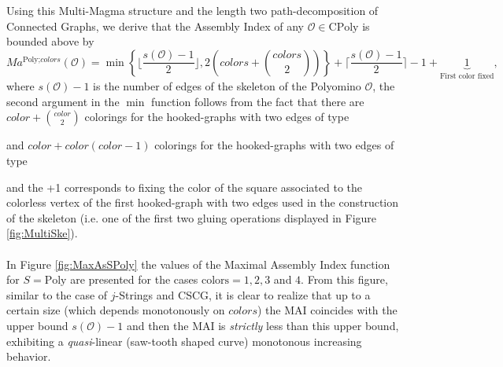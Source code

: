 \documentclass[letterpaper,12pt]{article}
\theoremstyle{definition}
\begin{document}
Using this Multi-Magma structure and the length two path-decomposition of Connected Graphs, we derive that the Assembly Index of any $\mathscr{O} \in \text{CPoly}$ is bounded above by
\begin{equation}
    Ma^{\text{Poly;}colors}(\mathscr{O}) = \min \left\{ \bigg\lfloor \frac{s(\mathscr{O})-1}{2} \bigg\rfloor, 2 \left(colors+\binom{colors}{2} \right)  \right\} + \bigg\lceil \frac{s(\mathscr{O})-1}{2} \bigg\rceil -1 + \underbrace{1}_{\text{First color fixed}},
\end{equation}
where $s(\mathscr{O})-1$ is the number of edges of the skeleton of the Polyomino $\mathscr{O}$, the second argument in the $\min$ function follows from the fact that there are $color+ \binom{color}{2}$ colorings for the hooked-graphs with two edges of type 
and $color + color(color-1)$ colorings for the hooked-graphs with two edges of type 
 and the +1 corresponds to fixing the color of the square associated to the colorless vertex of the first hooked-graph with two edges used in the construction of the skeleton (i.e. one of the first two gluing operations displayed in Figure \ref{fig:MultiSke}). \\\\
In Figure \ref{fig:MaxAsSPoly} the values of the Maximal Assembly Index function for $S=\text{Poly}$ are presented for the cases $\text{colors}=1,2,3$ and $4$. From this figure, similar to the case of $j$-Strings and CSCG, it is clear to realize that up to a certain size (which depends monotonously on $colors$) the MAI coincides with the upper bound $s(\mathscr{O})-1$ and then the MAI is \textit{strictly} less than this upper bound, exhibiting a \textit{quasi}-linear (saw-tooth shaped curve) monotonous increasing behavior.
\end{document}
